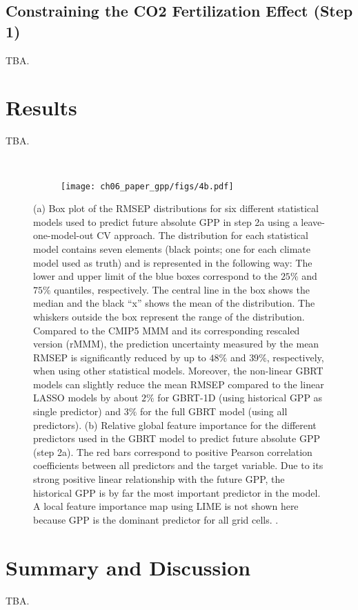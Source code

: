 \subsection{Constraining the \texorpdfstring{\acs{CO2}}{CO2} Fertilization
  Effect (Step 1)}
\label{subsec:06:step_1}

TBA.


\section{Results}
\label{sec:06:results}

TBA.

\begin{figure}[t]
  \centering
  \begin{subfigure}[b]{\SubfigureWidth{}}
    \caption{}
    \label{fig:06:step2a_ml_inference:a}
  \end{subfigure}
  ~
  \begin{subfigure}[b]{\SubfigureWidth{}}
    \texttt{[image: ch06\_paper\_gpp/figs/4b.pdf]}
    \caption{}
    \label{fig:06:step2a_ml_inference:b}
  \end{subfigure}
  \caption{(a) Box plot of the \acf{RMSEP} distributions for six different
    statistical models used to predict future absolute \acf{GPP} in step 2a
    using a leave-one-model-out \acl{CV} approach. The distribution for each
    statistical model contains seven elements (black points; one for each
    climate model used as truth) and is represented in the following way: The
    lower and upper limit of the blue boxes correspond to the $25 \unit{\%}$
    and $75 \unit{\%}$ quantiles, respectively. The central line in the box
    shows the median and the black \enquote{x} shows the mean of the
    distribution. The whiskers outside the box represent the range of the
    distribution. Compared to the \acs{CMIP}5 \acf{MMM} and its corresponding
    rescaled version (r\acs{MMM}), the prediction uncertainty measured by the
    mean \acs{RMSEP} is significantly reduced by up to $48 \unit{\%}$ and $39
    \unit{\%}$, respectively, when using other statistical models. Moreover,
    the non-linear \acf{GBRT} models can slightly reduce the mean \acs{RMSEP}
    compared to the linear \acf{LASSO} models by about $2 \unit{\%}$ for
    \acs{GBRT}-1D (using historical \acs{GPP} as single predictor) and $3
    \unit{\%}$ for the full \acs{GBRT} model (using all predictors). (b)
    Relative global feature importance for the different predictors used in
    the \acs{GBRT} model to predict future absolute \acs{GPP} (step 2a). The
    red bars correspond to positive Pearson correlation coefficients between
    all predictors and the target variable. Due to its strong positive linear
    relationship with the future \acs{GPP}, the historical \acs{GPP} is by far
    the most important predictor in the model. A local feature importance map
    using \acf{LIME} is not shown here because \acs{GPP} is the dominant
    predictor for all grid cells. .}
  \label{fig:06:step2a_ml_inference}
\end{figure}


\section{Summary and Discussion}
\label{sec:06:summary_and_discussion}

TBA.
